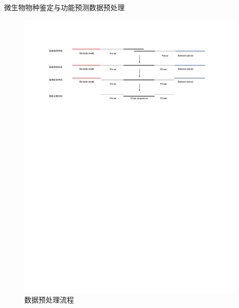 \documentclass{beamer}
\begin{document}
	\begin{frame}{微生物物种鉴定与功能预测}{数据预处理}
		\begin{figure}
			\centering
			\includegraphics[width=0.98\textwidth]{img/数据预处理.pdf}
			\caption{数据预处理流程}
		\end{figure}
	\end{frame}
\end{document}
